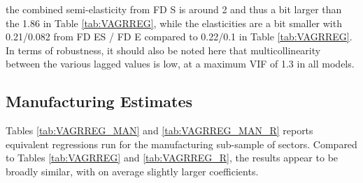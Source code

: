 \documentclass[a4paper]{article}
\begin{document}
\noindent the combined semi-elasticity from FD S is around 2 and thus a bit larger than the 1.86 in Table \ref{tab:VAGRREG}, while the elasticities are a bit smaller with 0.21/0.082 from FD ES / FD E compared to 0.22/0.1 in Table \ref{tab:VAGRREG}. In terms of robustness, it should also be noted here that multicollinearity between the various lagged values is low, at a maximum VIF of 1.3 in all models. 

\subsection{Manufacturing Estimates}

Tables \ref{tab:VAGRREG_MAN} and \ref{tab:VAGRREG_MAN_R} reports equivalent regressions run for the manufacturing sub-sample of sectors. Compared to Tables \ref{tab:VAGRREG} and \ref{tab:VAGRREG_R}, the results appear to be broadly similar, with on average slightly larger coefficients. 
\end{document}

